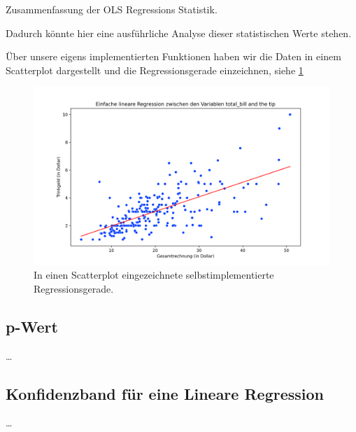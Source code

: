 \begin{table}[]
    
    \caption[bla]{Zusammenfassung der OLS Regressions Statistik.}
    \label{tab:regression}
\end{table}

Dadurch könnte hier eine ausführliche Analyse dieser statistischen Werte stehen. 

Über unsere eigens implementierten Funktionen haben wir die Daten in einem Scatterplot dargestellt und die Regressionsgerade einzeichnen, siehe \cref*{fig:regression}

\begin{figure}
    \centering
    \includegraphics[scale=0.17]{../figures/simple_reg.png}
    \caption{In einen Scatterplot eingezeichnete selbstimplementierte Regressionsgerade.}
    \label{fig:regression}
\end{figure}

\subsection{p-Wert}

\dots

\subsection{Konfidenzband für eine Lineare Regression}

\dots
